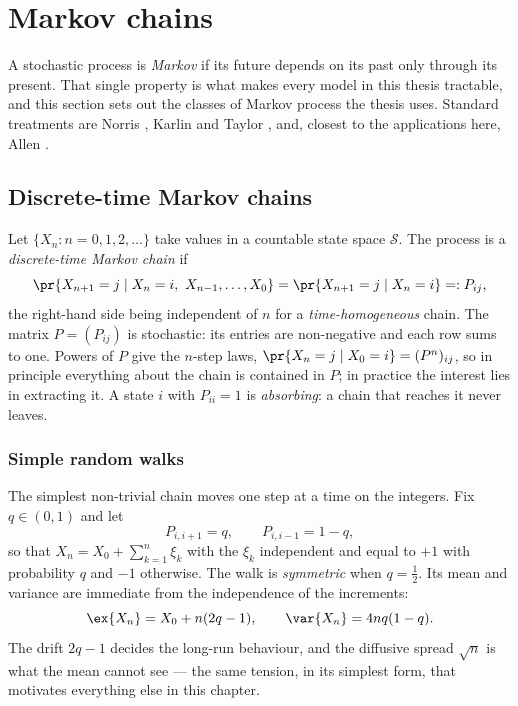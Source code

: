 \section{Markov chains}
\label{m:sec:chains}

A stochastic process is \emph{Markov} if its future depends on its past only
through its present. That single property is what makes every model in this thesis
tractable, and this section sets out the classes of Markov process the thesis uses.
Standard treatments are Norris \cite{Norris1997}, Karlin and Taylor
\cite{KarlinTaylor1975}, and, closest to the applications here, Allen
\cite{Allen2010}.

\subsection{Discrete-time Markov chains}
\label{m:sec:dtmc}

Let $\{X_n : n=0,1,2,\dots\}$ take values in a countable state space $\mathcal S$.
The process is a \emph{discrete-time Markov chain} if
\begin{equation}
\label{m:eq:dtmarkov}
\pr{X_{n+1}=j \mid X_n=i,\ X_{n-1},\dots,X_0} = \pr{X_{n+1}=j\mid X_n=i}
=: P_{ij},
\end{equation}
the right-hand side being independent of $n$ for a \emph{time-homogeneous} chain.
The matrix $P = (P_{ij})$ is stochastic: its entries are non-negative and each row
sums to one. Powers of $P$ give the $n$-step laws, $\pr{X_n=j\mid X_0=i}
= (P^n)_{ij}$, so in principle everything about the chain is contained in $P$;
in practice the interest lies in extracting it. A state $i$ with $P_{ii}=1$ is
\emph{absorbing}: a chain that reaches it never leaves.

\subsubsection{Simple random walks}
\label{m:sec:randomwalk}

The simplest non-trivial chain moves one step at a time on the integers. Fix
$q\in(0,1)$ and let
\begin{equation}
\label{m:eq:rwrates}
P_{i,i+1} = q,
\qquad
P_{i,i-1} = 1-q,
\end{equation}
so that $X_n = X_0 + \sum_{k=1}^{n}\xi_k$ with the $\xi_k$ independent and equal to
$+1$ with probability $q$ and $-1$ otherwise. The walk is \emph{symmetric} when
$q=\tfrac12$. Its mean and variance are immediate from the independence of the
increments:
\begin{equation}
\label{m:eq:rwmoments}
\ex{X_n} = X_0 + n(2q-1),
\qquad
\var{X_n} = 4nq(1-q).
\end{equation}
The drift $2q-1$ decides the long-run behaviour, and the diffusive spread
$\sqrt{n}$ is what the mean cannot see --- the same tension, in its simplest form,
that motivates everything else in this chapter.

